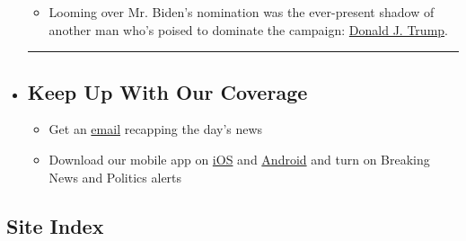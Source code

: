 \begin{itemize}
  \begin{itemize}
  \tightlist
  \item
    Looming over Mr. Biden's nomination was the ever-present shadow of
    another man who's poised to dominate the campaign:
    \href{https://www.nytimes3xbfgragh.onion/2020/08/20/us/politics/biden-dnc-speech-trump.html?action=click\&pgtype=Article\&state=default\&region=BELOW_MAIN_CONTENT\&context=storylines_guide}{Donald
    J. Trump}.
  \end{itemize}
\item
  \begin{center}\rule{0.5\linewidth}{\linethickness}\end{center}

  \hypertarget{keep-up-with-our-coverage}{%
  \subsection{Keep Up With Our
  Coverage}\label{keep-up-with-our-coverage}}

  \begin{itemize}
  \tightlist
  \item
    Get an
    \href{https://www.nytimes3xbfgragh.onion/newsletters/politics?action=click\&pgtype=Article\&state=default\&region=BELOW_MAIN_CONTENT\&context=storylines_guide}{email}
    recapping the day's news
  \end{itemize}

  \begin{itemize}
  \tightlist
  \item
    Download our mobile app on
    \href{https://apps.apple.com/us/app/nytimes/id284862083?ls=1\&mat_click_id=5c79ae7455014fd1bd66b5610c05b8f2-20191112-16948\&referrer=mat_click_id\%3D5c79ae7455014fd1bd66b5610c05b8f2-20191112-16948\%26link_click_id\%3D722930677036718082}{iOS}
    and
    \href{http://a.localytics.com/android?id=com.nytimes.android\&referrer=utm_source\%3Dother_nyt_mobile_web\%26utm_medium\%3DWeb\%2520page\%26utm_term\%3DGeneral\%2520Mobile\%2520Page\%26utm_campaign\%3DNYT\%2520Mobile\%2520General\%2520Page}{Android}
    and turn on Breaking News and Politics alerts
  \end{itemize}
\end{itemize}

\hypertarget{site-index}{%
\subsection{Site Index}\label{site-index}}

